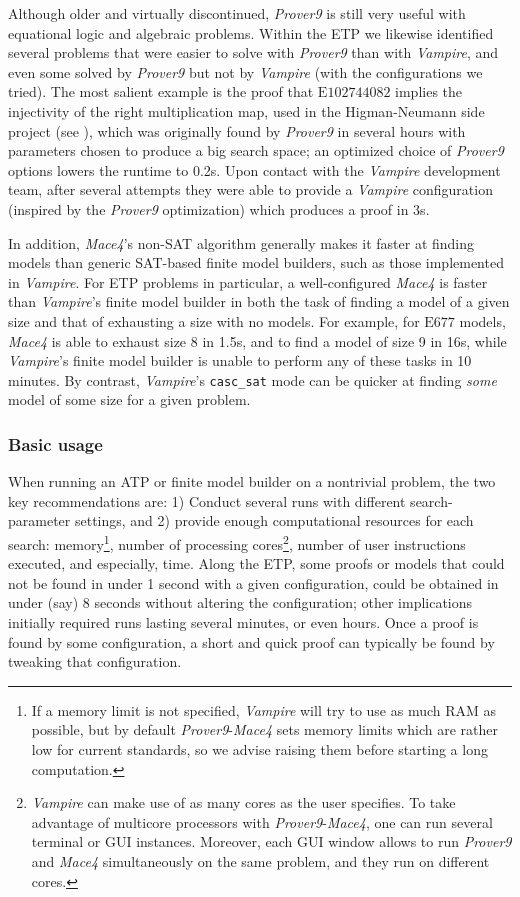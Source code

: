 \documentclass[12pt]{amsart}
\theoremstyle{definition}
\newcommand{\Eq}[1]{\mathrm{E}#1}
\begin{document}
Although older and virtually discontinued, \emph{Prover9} is still very useful with equational logic and algebraic problems. Within the ETP we likewise identified several problems that were easier to solve with \emph{Prover9} than with \emph{Vampire}, and even some solved by \emph{Prover9} but not by \emph{Vampire} (with the configurations we tried). The most salient example is the proof that $\Eq{102744082}$ implies the injectivity of the right multiplication map, used in the Higman-Neumann side project (see ), which was originally found by \emph{Prover9} in several hours with parameters chosen to produce a big search space; an optimized choice of \emph{Prover9} options lowers the runtime to 0.2s. Upon contact with the \emph{Vampire} development team, after several attempts they were able to provide a \emph{Vampire} configuration (inspired by the \emph{Prover9} optimization) which produces a proof in 3s.

In addition, \emph{Mace4}'s non-SAT algorithm generally makes it faster at finding models than generic SAT-based finite model builders, such as those implemented in \emph{Vampire}. For ETP problems in particular, a well-configured \emph{Mace4} is faster than \emph{Vampire}'s finite model builder in both the task of finding a model of a given size and that of exhausting a size with no models. For example, for $\Eq{677}$ models, \emph{Mace4} is able to exhaust size 8 in 1.5s, and to find a model of size 9 in 16s, while \emph{Vampire}'s finite model builder is unable to perform any of these tasks in 10 minutes. By contrast, \emph{Vampire}'s \verb|casc_sat| mode can be quicker at finding \emph{some} model of some size for a given problem.

\subsubsection{Basic usage}
When running an ATP or finite model builder on a nontrivial problem, the two key recommendations are: 1) Conduct several runs with different search-parameter settings, and 2) provide enough computational resources for each search: memory\footnote{If a memory limit is not specified, \emph{Vampire} will try to use as much RAM as possible, but by default \emph{Prover9}-\emph{Mace4} sets memory limits which are rather low for current standards, so we advise raising them before starting a long computation.}, number of processing cores\footnote{\emph{Vampire} can make use of as many cores as the user specifies. To take advantage of multicore processors with \emph{Prover9}-\emph{Mace4}, one can run several terminal or GUI instances. Moreover, each GUI window allows to run \emph{Prover9} and \emph{Mace4} simultaneously on the same problem, and they run on different cores.}, number of user instructions executed, and especially, time. Along the ETP, some proofs or models that could not be found in under 1 second with a given configuration, could be obtained in under (say) 8 seconds without altering the configuration; other implications initially required runs lasting several minutes, or even hours. Once a proof is found by some configuration, a short and quick proof can typically be found by tweaking that configuration.
\end{document}
